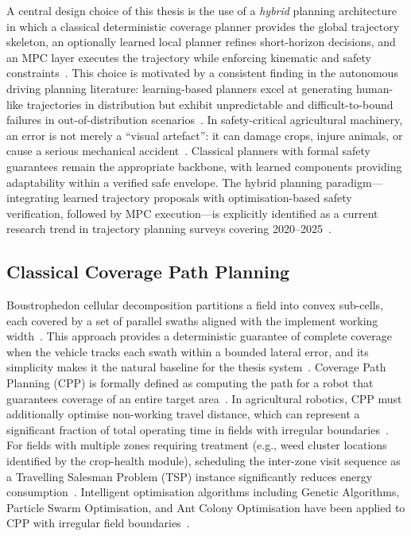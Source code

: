 \documentclass[12pt, a4paper]{article}
\begin{document}
A central design choice of this thesis is the use of a \emph{hybrid} planning architecture
in which a classical deterministic coverage planner provides the global trajectory
skeleton, an optionally learned local planner refines short-horizon decisions, and an MPC
layer executes the trajectory while enforcing kinematic and safety
constraints~\cite{ref2, ref3}. This choice is motivated by a consistent finding in the
autonomous driving planning literature: learning-based planners excel at generating
human-like trajectories in distribution but exhibit unpredictable and difficult-to-bound
failures in out-of-distribution scenarios~\cite{ref102, ref129, ref130}. In safety-critical
agricultural machinery, an error is not merely a ``visual artefact'': it can damage crops,
injure animals, or cause a serious mechanical accident~\cite{ref2}. Classical planners with
formal safety guarantees remain the appropriate backbone, with learned components providing
adaptability within a verified safe envelope. The hybrid planning paradigm---integrating
learned trajectory proposals with optimisation-based safety verification, followed by MPC
execution---is explicitly identified as a current research trend in trajectory planning
surveys covering 2020--2025~\cite{ref98, ref118, ref120}.

\subsection{Classical Coverage Path Planning}

Boustrophedon cellular decomposition partitions a field into convex sub-cells, each
covered by a set of parallel swaths aligned with the implement working width~\cite{ref138}.
This approach provides a deterministic guarantee of complete coverage when the vehicle
tracks each swath within a bounded lateral error, and its simplicity makes it the natural
baseline for the thesis system~\cite{ref1}. Coverage Path Planning (CPP) is formally
defined as computing the path for a robot that guarantees coverage of an entire target
area~\cite{ref109, ref135}. In agricultural robotics, CPP must additionally optimise
non-working travel distance, which can represent a significant fraction of total operating
time in fields with irregular boundaries~\cite{ref138}. For fields with multiple zones
requiring treatment (e.g., weed cluster locations identified by the crop-health module),
scheduling the inter-zone visit sequence as a Travelling Salesman Problem (TSP) instance
significantly reduces energy consumption~\cite{ref136}. Intelligent optimisation algorithms
including Genetic Algorithms, Particle Swarm Optimisation, and Ant Colony Optimisation
have been applied to CPP with irregular field boundaries~\cite{ref104}.
\end{document}
